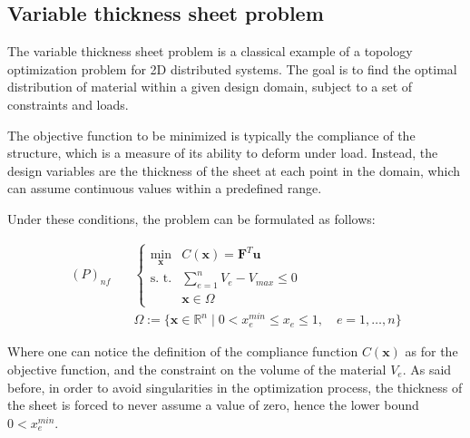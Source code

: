 \subsection{Variable thickness sheet problem}
\label{sec:variable_thickness_sheet_problem}

The variable thickness sheet problem is a classical example of a topology optimization problem for 2D distributed systems.
The goal is to find the optimal distribution of material within a given design domain, subject to a set of constraints and loads.

The objective function to be minimized is typically the compliance of the structure, which is a measure of its ability to deform under load.
Instead, the design variables are the thickness of the sheet at each point in the domain, which can assume continuous values within a predefined range.

Under these conditions, the problem can be formulated as follows:

\begin{equation}
    \begin{aligned}
        (P)_{nf} \quad & \begin{cases}
                             \min_{\bm{x}} & C(\bm{x}) = \bm{F}^T \bm{u}         \\
                             \text{s. t.}  & \sum_{e=1}^{n} V_e - V_{max} \leq 0 \\
                                           & \bm{x} \in \Omega
                         \end{cases}                              \\
                       & \Omega := \{ \bm{x} \in \mathbb{R}^n \mid 0 < x_e^{min} \le x_e \le 1, \quad e = 1, \dots, n \}
    \end{aligned}
    \label{eq:compliance_minimization_problem}
\end{equation}

Where one can notice the definition of the compliance function $C(\bm{x})$ as for the objective function, and the constraint on the volume of the material $V_e$.
As said before, in order to avoid singularities in the optimization process, the thickness of the sheet is forced to never assume a value of zero, hence the lower bound $0 < x_e^{min}$.
